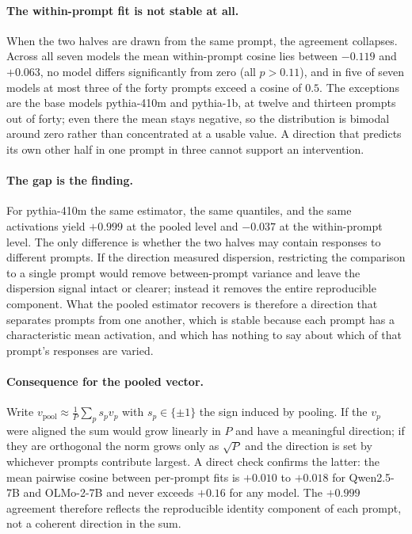 \paragraph{The within-prompt fit is not stable at all.}
When the two halves are drawn from the same prompt, the agreement collapses. Across all seven models
the mean within-prompt cosine lies between $-0.119$ and $+0.063$, no model differs significantly
from zero (all $p > 0.11$), and in five of seven models at most three of the forty prompts exceed a
cosine of $0.5$. The exceptions are the base models pythia-410m and pythia-1b, at twelve and
thirteen prompts out of forty; even there the mean stays negative, so the distribution is bimodal
around zero rather than concentrated at a usable value. A direction that predicts its own other half
in one prompt in three cannot support an intervention.

\paragraph{The gap is the finding.}
For pythia-410m the same estimator, the same quantiles, and the same activations yield $+0.999$ at
the pooled level and $-0.037$ at the within-prompt level. The only difference is whether the two
halves may contain responses to different prompts. If the direction measured dispersion, restricting
the comparison to a single prompt would remove between-prompt variance and leave the dispersion
signal intact or clearer; instead it removes the entire reproducible component. What the pooled
estimator recovers is therefore a direction that separates prompts from one another, which is
stable because each prompt has a characteristic mean activation, and which has nothing to say about
which of that prompt's responses are varied.

\paragraph{Consequence for the pooled vector.}
Write $v_{\text{pool}} \approx \frac{1}{P}\sum_p s_p v_p$ with $s_p \in \{\pm 1\}$ the sign
induced by pooling. If the $v_p$ were aligned the sum would grow linearly in $P$ and have a
meaningful direction; if they are orthogonal the norm grows only as $\sqrt{P}$ and the direction is
set by whichever prompts contribute largest. A direct check confirms the latter: the mean pairwise
cosine between per-prompt fits is $+0.010$ to $+0.018$ for Qwen2.5-7B and OLMo-2-7B and never exceeds
$+0.16$ for any model. The $+0.999$ agreement therefore reflects the reproducible identity component
of each prompt, not a coherent direction in the sum.

